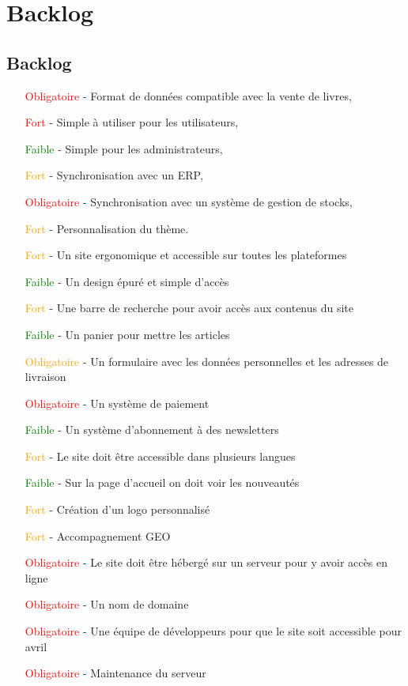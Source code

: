\documentclass[a4paper,12pt]{report}
\begin{document}
\part{Backlog}
\chapter{Backlog}
\begin{itemize}
\item[\textcolor{red}{Obligatoire} -] Format de données compatible avec la vente
  de livres,
\item[\textcolor{red}{Fort} -] Simple à utiliser pour les utilisateurs,
\item[\textcolor{green}{Faible} -] Simple pour les administrateurs,
\item[\textcolor{orange}{Fort} -] Synchronisation avec un ERP,
\item[\textcolor{red}{Obligatoire} -] Synchronisation avec un système de
  gestion de stocks,
\item[\textcolor{orange}{Fort} - ] Personnalisation du thème.
\item[\textcolor{orange}{Fort} - ] Un site ergonomique et accessible sur toutes les plateformes
\item[\textcolor{green}{Faible} - ] Un design épuré et simple d'accès
\item[\textcolor{orange}{Fort} - ] Une barre de recherche pour avoir accès aux contenus du site
\item[\textcolor{green}{Faible} - ] Un panier pour mettre les articles
\item[\textcolor{orange}{Obligatoire} - ] Un formulaire avec les
  données personnelles et les adresses de livraison
\item[\textcolor{red}{Obligatoire} - ] Un système de paiement
\item[\textcolor{green}{Faible} - ] Un système d'abonnement à des newsletters
\item[\textcolor{orange}{Fort} - ] Le site doit être accessible dans plusieurs langues
\item[\textcolor{green}{Faible} - ] Sur la page d'accueil on doit voir les nouveautés
\item[\textcolor{orange}{Fort} - ] Création d'un logo personnalisé
\item[\textcolor{orange}{Fort} - ] Accompagnement GEO
\item[\textcolor{red}{Obligatoire} - ] Le site doit être hébergé sur un serveur pour y avoir accès en ligne
\item[\textcolor{red}{Obligatoire} - ] Un nom de domaine
\item[\textcolor{red}{Obligatoire} - ] Une équipe de développeurs pour que le site soit accessible pour avril
\item[\textcolor{red}{Obligatoire} - ] Maintenance du serveur
\end{itemize}
\end{document}
